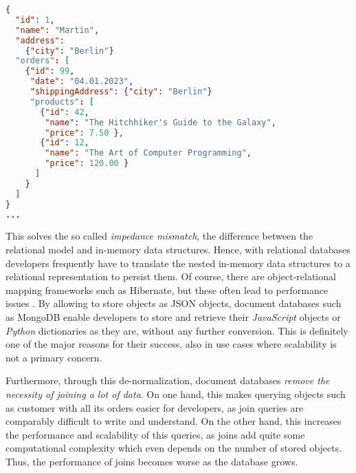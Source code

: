 \begin{lstlisting}[language=JSON, caption=JSON Document, captionpos=b, label=lst:JSONDocument]
{
  "id": 1,
  "name": "Martin",
  "address": 
    {"city": "Berlin"}
  "orders": [
    {"id": 99,
     "date": "04.01.2023",
     "shippingAddress": {"city": "Berlin"}
     "products": [
       {"id": 42,
        "name": "The Hitchhiker's Guide to the Galaxy",
        "price": 7.50 },
       {"id": 12,
        "name": "The Art of Computer Programming",
        "price": 120.00 }
      ]
    }
  ]
}
...
\end{lstlisting}


This solves the so called \emph{impedance mismatch}, the difference between the relational model and in-memory data structures. Hence, with relational databases developers frequently have to translate the nested in-memory data structures to a relational representation to persist them. Of course, there are object-relational mapping frameworks such as Hibernate, but these often lead to performance issues \cite{NoSQLDistilled}. By allowing to store objects as JSON objects, document databases such as MongoDB enable developers to store and retrieve their \emph{JavaScript} objects or \emph{Python} dictionaries as they are, without any further conversion. This is definitely one of the major reasons for their success, also in use cases where scalability is not a primary concern.\par
Furthermore, through this de-normalization, document databases \emph{remove the necessity of joining a lot of data}. On one hand, this makes querying objects such as customer with all its orders easier for developers, as join queries are comparably difficult to write and understand. On the other hand, this increases the performance and scalability of this queries, as joins add quite some computational complexity which even depends on the number of stored objects. Thus, the performance of joins becomes worse as the database grows.\par
